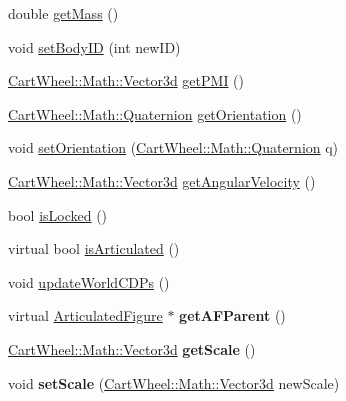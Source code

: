 \begin{DoxyCompactItemize}
\item 
double \hyperlink{classCartWheel_1_1Physics_1_1RigidBody_a1371aa6d98aa5d78be4cf797905ffc04}{getMass} ()
\item 
void \hyperlink{classCartWheel_1_1Physics_1_1RigidBody_a7a121f4b57a20837db2a76c2c49f2598}{setBodyID} (int newID)
\item 
\hyperlink{classCartWheel_1_1Math_1_1Vector3d}{CartWheel::Math::Vector3d} \hyperlink{classCartWheel_1_1Physics_1_1RigidBody_a2f0775cdd342fce39edf36185ef67b2d}{getPMI} ()
\item 
\hyperlink{classCartWheel_1_1Math_1_1Quaternion}{CartWheel::Math::Quaternion} \hyperlink{classCartWheel_1_1Physics_1_1RigidBody_ad2e28d46c26b424c287b39939f9ff3c1}{getOrientation} ()
\item 
void \hyperlink{classCartWheel_1_1Physics_1_1RigidBody_a1d1a3a4e94866d7fde89ab81b117125b}{setOrientation} (\hyperlink{classCartWheel_1_1Math_1_1Quaternion}{CartWheel::Math::Quaternion} q)
\item 
\hyperlink{classCartWheel_1_1Math_1_1Vector3d}{CartWheel::Math::Vector3d} \hyperlink{classCartWheel_1_1Physics_1_1RigidBody_ad0587e004de409e67de60eda3987f98b}{getAngularVelocity} ()
\item 
bool \hyperlink{classCartWheel_1_1Physics_1_1RigidBody_a39b5754e21393bd02d0eb0e853692b84}{isLocked} ()
\item 
virtual bool \hyperlink{classCartWheel_1_1Physics_1_1RigidBody_aee97ae09ce1b2f4643b39d3422a4243d}{isArticulated} ()
\item 
void \hyperlink{classCartWheel_1_1Physics_1_1RigidBody_ac302f7d357d4bd862a6eec7f7566c4c5}{updateWorldCDPs} ()
\item 
\hypertarget{classCartWheel_1_1Physics_1_1RigidBody_af4a9f4fc5f8ef6188f5ee93136fafcb6}{
virtual \hyperlink{classCartWheel_1_1Physics_1_1ArticulatedFigure}{ArticulatedFigure} $\ast$ {\bfseries getAFParent} ()}
\label{classCartWheel_1_1Physics_1_1RigidBody_af4a9f4fc5f8ef6188f5ee93136fafcb6}

\item 
\hypertarget{classCartWheel_1_1Physics_1_1RigidBody_a02a6f6f72371084fba7f0725d997a17a}{
\hyperlink{classCartWheel_1_1Math_1_1Vector3d}{CartWheel::Math::Vector3d} {\bfseries getScale} ()}
\label{classCartWheel_1_1Physics_1_1RigidBody_a02a6f6f72371084fba7f0725d997a17a}

\item 
\hypertarget{classCartWheel_1_1Physics_1_1RigidBody_a4ac600a88b06273daf7bc1963cd1331d}{
void {\bfseries setScale} (\hyperlink{classCartWheel_1_1Math_1_1Vector3d}{CartWheel::Math::Vector3d} newScale)}
\label{classCartWheel_1_1Physics_1_1RigidBody_a4ac600a88b06273daf7bc1963cd1331d}

\end{DoxyCompactItemize}
